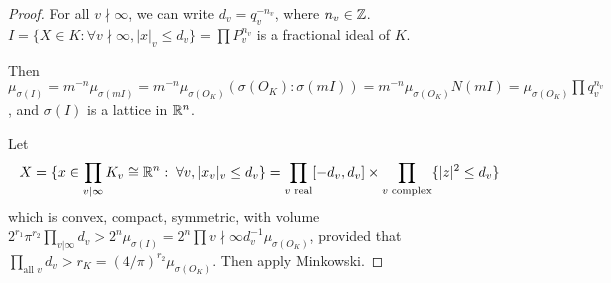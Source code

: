 \documentclass[10pt,a4paper]{article}
\begin{document}
\begin{proof}
  For all $v \nmid \infty$, we can write $d_v = q_v^{-n_v}$, where $n_v \in \mathbb{Z}$. $I = \{X \in K : \forall v \nmid \infty, |x|_v \leq d_v\} = \prod P_v^{n_v}$ is a fractional ideal of $K$.

  Then $\mu_{\sigma(I)} = m^{-n}\mu_{\sigma(mI)} = m^{-n}\mu_{\sigma(O_K)}(\sigma(O_K):\sigma(mI)) = m^{-n}\mu_{\sigma(O_K)} N(mI) = \mu_{\sigma(O_K)} \prod q_v^{n_v}$, and $\sigma(I)$ is a lattice in $\mathbb{R}^n$.

  Let
  \[X = \{x \in \prod_{v\mid \infty}K_v \cong \R^n : \forall v, |x_v|_v \leq d_v\} = \prod_{v \text{ real}} [-d_v,d_v] \times \prod_{v \text{ complex}} \{|z|^2 \leq d_v\}\]
  which is convex, compact, symmetric, with volume $2^{r_1}\pi^{r_2}\prod_{v|\infty}d_v > 2^n \mu_{\sigma(I)} = 2^n \prod{v \nmid \infty} d_v^{-1} \mu_{\sigma(O_K)}$, provided that $\prod_{\text{all }v}d_v > r_K = (4/\pi)^{r_2}\mu_{\sigma(O_K)}$. Then apply Minkowski.
\end{proof}
\end{document}

